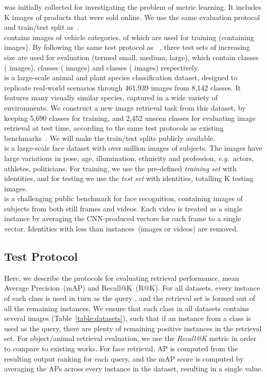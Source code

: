\documentclass[runningheads]{llncs}
\providecommand{\eg}[0]{\emph{e.g.}}
\begin{document}
was initially collected for investigating the problem of metric learning.
It includes K images of products that were sold online. 
We use the same evaluation protocol and train/test split as~\cite{Wang19ranked}. \\

contains  images of  vehicle categories,  of which are used for training (containing  images). By following the same test protocol as ~\cite{Wah11}, three test sets of increasing size are used for evaluation (termed small, medium, large), which contain  classes ( images),  classes ( images) and  classes ( images) respectively.\\

is a large-scale animal and plant species classification dataset, designed to replicate real-world scenarios through 461,939 images from 8,142 classes. 
It features many visually similar species, captured in a wide variety of environments. 
We construct a new image retrieval task from this dataset, 
by keeping 5,690 classes for training, 
and 2,452 unseen classes for evaluating image retrieval at test time,  according to the same test protocols as existing benchmarks~\cite{Wang19ranked}. 
We will make the train/test splits publicly available.\\

is a large-scale face dataset with over  million images of  subjects. 
The images have large variations in pose, age, illumination, ethnicity and profession, \eg\ actors, athletes, politicians.
For training, we use the pre-defined \emph{training set} with  identities,
and for testing we use the \emph{test set} with  identities, totalling K testing images.\\

is a challenging public benchmark for face recognition, containing images of subjects from both still frames and videos. Each video is treated as a single instance by averaging the CNN-produced vectors for each frame to a single vector. Identities with less than  instances~(images or videos) are removed.

\subsection{Test Protocol}
Here, we describe the protocols for evaluating retrieval performance, 
mean Average Precision~(mAP) and  Recall@K~(R@K).
For all datasets, every instance of each class is used in turn as the query , 
and the retrieval set  is formed out of all the remaining instances. 
We ensure that each class in all datasets contains several images (Table~\ref{table:datasets}), 
such that if an instance from a class is used as the query, 
there are plenty of remaining positive instances in the retrieval set. 
For object/animal retrieval evaluation, 
we use the \textit{Recall@K} metric in order to compare to existing works. 
For face retrieval, AP is computed from the resulting output ranking for each query,
and the mAP score is computed by averaging the APs across every instance in the dataset, resulting in a single value. 
\end{document}
